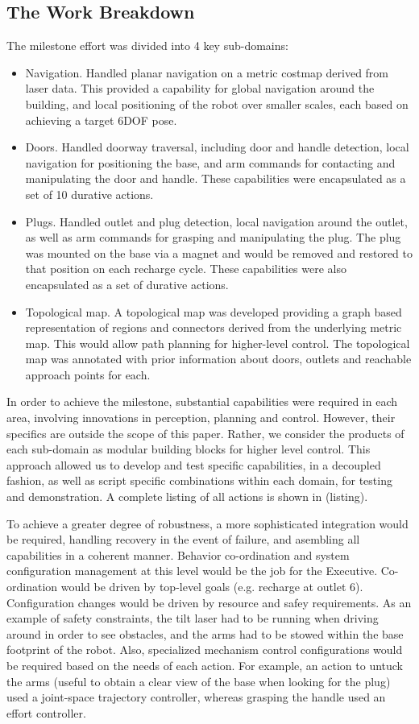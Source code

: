 \documentclass[letterpaper]{article}
\begin{document}
\subsection{The Work Breakdown}
The milestone effort was divided into 4 key sub-domains:
\begin{itemize}
\item Navigation. Handled planar navigation on a metric costmap derived from laser data. This provided a capability for global navigation around the building, and local positioning of the robot over smaller scales, each based on achieving a target 6DOF pose. 
\item Doors. Handled doorway traversal, including door and handle detection, local navigation for positioning the base, and arm commands for contacting and manipulating the door and handle. These capabilities were encapsulated as a set of 10 durative actions. 
\item Plugs. Handled outlet and plug detection, local navigation around the outlet, as well as arm commands for grasping and manipulating the plug. The plug was mounted on the base via a magnet and would be removed and restored to that position on each recharge cycle. These capabilities were also encapsulated as a set of durative actions.
\item Topological map. A topological map was developed providing a graph based representation of regions and connectors derived from the underlying metric map. This would allow path planning for higher-level control. The topological map was annotated with prior information about doors, outlets and reachable approach points for each.
\end{itemize}

In order to achieve the milestone, substantial capabilities were required in each area, involving innovations in perception, planning and control. However, their specifics are outside the scope of this paper. Rather, we consider the products of each sub-domain as modular building blocks for higher level control. This approach allowed us to develop and test specific capabilities, in a decoupled fashion, as well as script specific combinations within each domain, for testing and demonstration. A complete listing of all actions is shown in (listing).

To achieve a greater degree of robustness, a more sophisticated integration would be required, handling recovery in the event of failure, and asembling all capabilities in a coherent manner. Behavior co-ordination and system configuration management at this level would be the job for the Executive. Co-ordination would be driven by top-level goals (e.g. recharge at outlet 6). Configuration changes would be driven by resource and safey requirements. As an example of safety constraints, the tilt laser had to be running when driving around in order to see obstacles, and the arms had to be stowed within the base footprint of the robot. Also, specialized mechanism control configurations would be required based on the needs of each action. For example, an action to untuck the arms (useful to obtain a clear view of the base when looking for the plug) used a joint-space trajectory controller, whereas grasping the handle used an effort controller.
\end{document}
